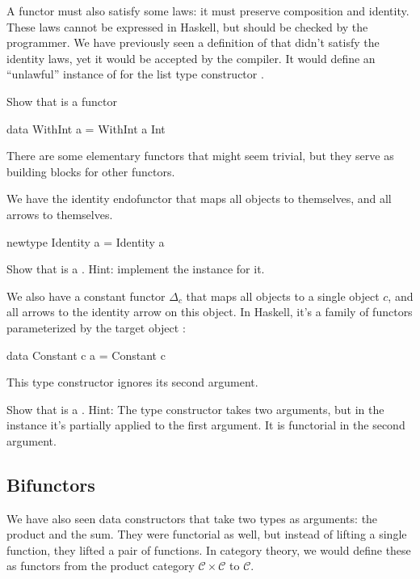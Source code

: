 \documentclass[DaoFP]{subfiles}
\begin{document}
A functor must also satisfy some laws: it must preserve composition and identity. These laws cannot be expressed in Haskell, but should be checked by the programmer. We have previously seen a definition of  that didn't satisfy the identity laws, yet it would be accepted by the compiler. It would define an ``unlawful'' instance of  for the list type constructor \hask{[]}.

\begin{exercise}
Show that  is a functor
\begin{haskell}
data WithInt a = WithInt a Int
\end{haskell}
\end{exercise}

There are some elementary functors that might seem trivial, but they serve as building blocks for other functors. 

We have the identity endofunctor that maps all objects to themselves, and all arrows to themselves. 
\begin{haskell}
newtype Identity a = Identity a
\end{haskell}
\begin{exercise}
Show that  is a . Hint: implement the  instance for it.
\end{exercise}


We also have a constant functor $\Delta_c$ that maps all objects to a single object $c$, and all arrows to the identity arrow on this object. In Haskell, it's a family of functors parameterized by the target object :
\begin{haskell}
data Constant c a = Constant c
\end{haskell}
This type constructor ignores its second argument.


\begin{exercise}
Show that  is a . Hint: The type constructor takes two arguments, but in the  instance it's partially applied to the first argument. It is functorial in the second argument.
\end{exercise}


\subsection{Bifunctors}

We have also seen data constructors that take two types as arguments: the product and the sum. They were functorial as well, but instead of lifting a single function, they lifted a pair of functions. In category theory, we would define these as functors from the product category $\mathcal{C} \times \mathcal{C}$ to $\mathcal{C}$.
\end{document}
